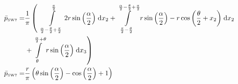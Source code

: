 \begin{align}
    \bar{p}_{\text{\tiny{SW7}}} =&\frac{1}{\pi} \left(\;\;\int\limits_{\frac{\alpha}{2} - \frac{\theta}{2} + \frac{\pi}{2}}^{\frac{\pi}{2}}2 r \sin{\left (\frac{\alpha}{2} \right )}\;\mathrm{d}x_{2}+\int\limits_{\frac{\pi}{2} - \frac{\theta}{2}}^{\frac{\alpha}{2} - \frac{\theta}{2} + \frac{\pi}{2}}r \sin{\left (\frac{\alpha}{2} \right )} - r \cos{\left (\frac{\theta}{2} + x_{2} \right )}\;\mathrm{d}x_{2}\right.\notag\\
 &\left.+\int\limits_{\theta}^{\frac{\alpha}{2} + \theta}r \sin{\left (\frac{\alpha}{2} \right )}\;\mathrm{d}x_{3}\right)\label{pSW7Def}\\
    \bar{p}_{\text{\tiny{SW7}}}  =& \frac{r}{\pi} \left(\theta \sin{\left (\frac{\alpha}{2} \right )} - \cos{\left (\frac{\alpha}{2} \right )} + 1\right)\label{pSW7Sln}
\end{align}
